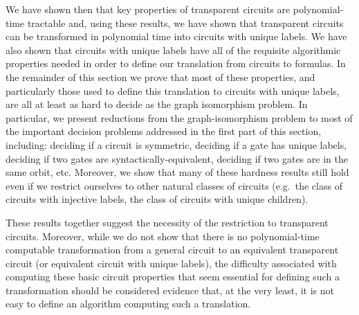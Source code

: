 \documentclass[../paper.tex]{subfiles}
\begin{document}

We have shown then that key properties of transparent circuits are
polynomial-time tractable and, using these results, we have shown that
transparent circuits can be transformed in polynomial time into circuits with
unique labels. We have also shown that circuits with unique labels have all of
the requisite algorithmic properties needed in order to define our translation
from circuits to formulas. In the remainder of this section we prove that most
of these properties, and particularly those used to define this translation to
circuits with unique labels, are all at least as hard to decide as the graph
isomorphism problem. In particular, we present reductions from the
graph-isomorphism problem to most of the important decision problems addressed
in the first part of this section, including: deciding if a circuit is
symmetric, deciding if a gate has unique labels, deciding if two gates are
syntactically-equivalent, deciding if two gates are in the same orbit, etc.
Moreover, we show that many of these hardness results still hold even if we
restrict ourselves to other natural classes of circuits (e.g.\ the class of
circuits with injective labels, the class of circuits with unique children).

These results together suggest the necessity of the restriction to transparent
circuits. Moreover, while we do not show that there is no polynomial-time
computable transformation from a general circuit to an equivalent transparent
circuit (or equivalent circuit with unique labels), the difficulty associated
with computing these basic circuit properties that seem essential for defining
such a transformation should be considered evidence that, at the very least, it
is not easy to define an algorithm computing such a translation.

\end{document}

